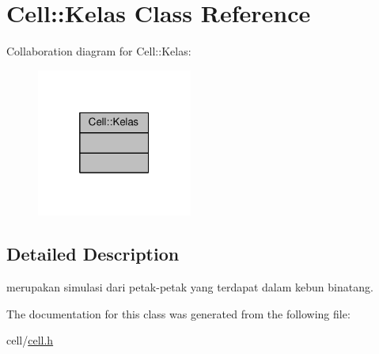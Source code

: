 \hypertarget{classCell_1_1Kelas}{}\section{Cell\+:\+:Kelas Class Reference}
\label{classCell_1_1Kelas}


Collaboration diagram for Cell\+:\+:Kelas\+:
\nopagebreak
\begin{figure}[H]
\begin{center}
\leavevmode
\includegraphics[width=145pt]{classCell_1_1Kelas__coll__graph}
\end{center}
\end{figure}


\subsection{Detailed Description}
merupakan simulasi dari petak-\/petak yang terdapat dalam kebun binatang. 

The documentation for this class was generated from the following file\+:\begin{DoxyCompactItemize}
\item 
cell/\hyperlink{cell_8h}{cell.\+h}\end{DoxyCompactItemize}
